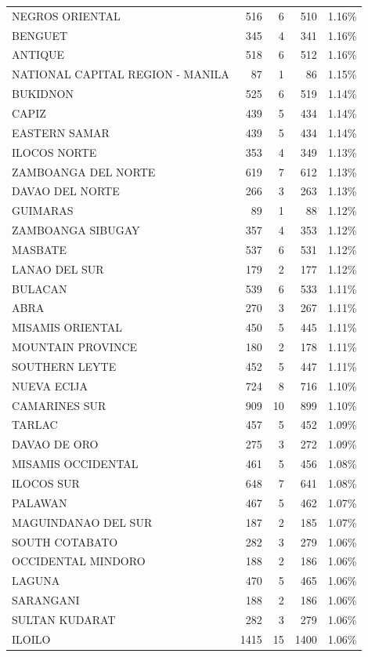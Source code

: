 \begin{tabular}{lrrrr}
NEGROS ORIENTAL & 516 & 6 & 510 & 1.16\% \\
BENGUET & 345 & 4 & 341 & 1.16\% \\
ANTIQUE & 518 & 6 & 512 & 1.16\% \\
NATIONAL CAPITAL REGION - MANILA & 87 & 1 & 86 & 1.15\% \\
BUKIDNON & 525 & 6 & 519 & 1.14\% \\
CAPIZ & 439 & 5 & 434 & 1.14\% \\
EASTERN SAMAR & 439 & 5 & 434 & 1.14\% \\
ILOCOS NORTE & 353 & 4 & 349 & 1.13\% \\
ZAMBOANGA DEL NORTE & 619 & 7 & 612 & 1.13\% \\
DAVAO DEL NORTE & 266 & 3 & 263 & 1.13\% \\
GUIMARAS & 89 & 1 & 88 & 1.12\% \\
ZAMBOANGA SIBUGAY & 357 & 4 & 353 & 1.12\% \\
MASBATE & 537 & 6 & 531 & 1.12\% \\
LANAO DEL SUR & 179 & 2 & 177 & 1.12\% \\
BULACAN & 539 & 6 & 533 & 1.11\% \\
ABRA & 270 & 3 & 267 & 1.11\% \\
MISAMIS ORIENTAL & 450 & 5 & 445 & 1.11\% \\
MOUNTAIN PROVINCE & 180 & 2 & 178 & 1.11\% \\
SOUTHERN LEYTE & 452 & 5 & 447 & 1.11\% \\
NUEVA ECIJA & 724 & 8 & 716 & 1.10\% \\
CAMARINES SUR & 909 & 10 & 899 & 1.10\% \\
TARLAC & 457 & 5 & 452 & 1.09\% \\
DAVAO DE ORO & 275 & 3 & 272 & 1.09\% \\
MISAMIS OCCIDENTAL & 461 & 5 & 456 & 1.08\% \\
ILOCOS SUR & 648 & 7 & 641 & 1.08\% \\
PALAWAN & 467 & 5 & 462 & 1.07\% \\
MAGUINDANAO DEL SUR & 187 & 2 & 185 & 1.07\% \\
SOUTH COTABATO & 282 & 3 & 279 & 1.06\% \\
OCCIDENTAL MINDORO & 188 & 2 & 186 & 1.06\% \\
LAGUNA & 470 & 5 & 465 & 1.06\% \\
SARANGANI & 188 & 2 & 186 & 1.06\% \\
SULTAN KUDARAT & 282 & 3 & 279 & 1.06\% \\
ILOILO & 1415 & 15 & 1400 & 1.06\% \\

\end{tabular}
